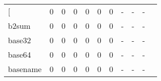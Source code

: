 \begin{longtable}{lp{1.2cm}p{1.2cm}p{1.2cm}p{1.2cm}p{1.2cm}p{1.2cm}p{1.2cm}p{1.2cm}p{1.2cm}p{1.2cm}}
\bottomrule
\endlastfoot
{[}         &                                     0 &                                                  0 &                                                  0 &                                                  0 &                                                  0 &                                                  0 &                                                  - &                                                  - &                                                  - \\
b2sum     &                                     0 &                                                  0 &                                                  0 &                                                  0 &                                                  0 &                                                  0 &                                                  - &                                                  - &                                                  - \\
base32    &                                     0 &                                                  0 &                                                  0 &                                                  0 &                                                  0 &                                                  0 &                                                  - &                                                  - &                                                  - \\
base64    &                                     0 &                                                  0 &                                                  0 &                                                  0 &                                                  0 &                                                  0 &                                                  - &                                                  - &                                                  - \\
basename  &                                     0 &                                                  0 &                                                  0 &                                                  0 &                                                  0 &                                                  0 &                                                  - &                                                  - &                                                  - \\

\end{longtable}
